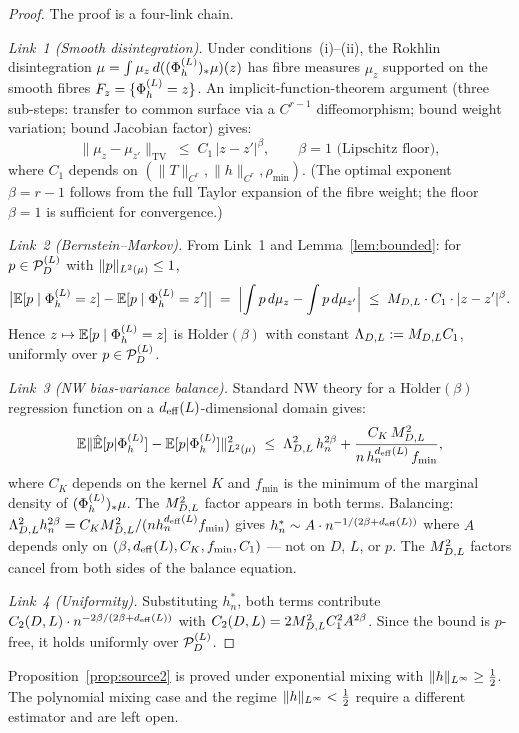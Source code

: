 \begin{proof}
The proof is a four-link chain.

\emph{Link~1 (Smooth disintegration).}
Under conditions~(i)--(ii), the Rokhlin disintegration
$\mu = \int \mu_z\,d((\Phi_h^{(L)})_*\mu)(z)$ has fibre measures $\mu_z$ supported on
the smooth fibres $F_z = \{\Phi_h^{(L)} = z\}$.
An implicit-function-theorem argument (three sub-steps: transfer to common
surface via a $C^{r-1}$ diffeomorphism; bound weight variation; bound
Jacobian factor) gives:
\[
  \|\mu_z - \mu_{z'}\|_{\mathrm{TV}} \;\leq\; C_1\,|z - z'|^\beta,
  \qquad \beta = 1 \text{ (Lipschitz floor)},
\]
where $C_1$ depends on $(\|T\|_{C^r}, \|h\|_{C^r}, \rho_{\min})$.
(The optimal exponent $\beta = r-1$ follows from the full Taylor expansion of
the fibre weight; the floor $\beta = 1$ is sufficient for convergence.)

\emph{Link~2 (Bernstein--Markov).}
From Link~1 and Lemma~\ref{lem:bounded}: for $p \in \mathcal{P}_D^{(L)}$ with
$\|p\|_{L^{2}(\mu)} \leq 1$,
\[
  \bigl|\mathbb{E}[p \mid \Phi_h^{(L)} = z] - \mathbb{E}[p \mid \Phi_h^{(L)} = z']\bigr|
  \;=\; \Bigl|\int p\,d\mu_z - \int p\,d\mu_{z'}\Bigr|
  \;\leq\; M_{D,L} \cdot C_1 \cdot |z - z'|^\beta.
\]
Hence $z \mapsto \mathbb{E}[p \mid \Phi_h^{(L)} = z]$ is $\mathrm{H\ddot{o}lder}(\beta)$
with constant $\Lambda_{D,L} := M_{D,L} C_1$, uniformly over $p \in \mathcal{P}_D^{(L)}$.

\emph{Link~3 (NW bias-variance balance).}
Standard NW theory \cite{Gyorfi2002} for a $\mathrm{H\ddot{o}lder}(\beta)$
regression function on a $d_{\mathrm{eff}}(L)$-dimensional domain gives:
\[
  \mathbb{E}\|\hat{\mathbb{E}}[p|\Phi_h^{(L)}] - \mathbb{E}[p|\Phi_h^{(L)}]\|_{L^{2}(\mu)}^2
  \;\leq\; \Lambda_{D,L}^2\,h_n^{2\beta}
    + \frac{C_K\,M_{D,L}^2}{n\,h_n^{d_{\mathrm{eff}}(L)}\,f_{\min}},
\]
where $C_K$ depends on the kernel $K$ and $f_{\min}$ is the minimum of the
marginal density of $(\Phi_h^{(L)})_*\mu$.
The $M_{D,L}^2$ factor appears in both terms.
Balancing: $\Lambda_{D,L}^2 h_n^{2\beta} = C_K M_{D,L}^2 / (n h_n^{d_{\mathrm{eff}}(L)} f_{\min})$
gives $h_n^* \sim A \cdot n^{-1/(2\beta+d_{\mathrm{eff}}(L))}$ where $A$ depends only
on $(\beta, d_{\mathrm{eff}}(L), C_K, f_{\min}, C_1)$ --- not on $D$, $L$, or $p$.
The $M_{D,L}^2$ factors cancel from both sides of the balance equation.

\emph{Link~4 (Uniformity).}
Substituting $h_n^*$, both terms contribute
$C_2(D,L) \cdot n^{-2\beta/(2\beta+d_{\mathrm{eff}}(L))}$ with
$C_2(D,L) = 2M_{D,L}^2 C_1^2 A^{2\beta}$.
Since the bound is $p$-free, it holds uniformly over $\mathcal{P}_D^{(L)}$.
\end{proof}

\begin{remark}[Scope]
Proposition~\ref{prop:source2} is proved under exponential mixing with
$\|h\|_{L^{\infty}} \geq \frac{1}{2}$.
The polynomial mixing case and the regime $\|h\|_{L^{\infty}} < \frac{1}{2}$
require a different estimator and are left open.
\end{remark}

